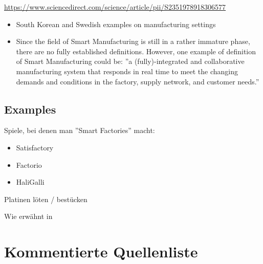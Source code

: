 \documentclass[11pt,titlepage]{article}
\begin{document}
  \url{https://www.sciencedirect.com/science/article/pii/S2351978918306577}
  \begin{itemize}
    \item South Korean and Swedish examples on manufacturing settings
    \item Since the field of Smart Manufacturing is still in a rather immature phase, there are no fully established
    definitions. However, one example of definition of Smart Manufacturing could be: ''a (fully)-integrated and
    collaborative manufacturing system that responds in real time to meet the changing demands and conditions in the
    factory, supply network, and customer needs.''
  \end{itemize}


  \subsection{Examples}
  \label{sec:Brainstorm_Examples}

  Spiele, bei denen man ''Smart Factories'' macht:
  \begin{itemize}
    \item Satisfactory 
    \item Factorio
    \item HaliGalli
  \end{itemize}


Platinen löten / bestücken

Wie erwähnt in \cite{RICHARDS.2020}

\pagebreak

\section{Kommentierte Quellenliste}
\label{sec:KommentierteQuellenliste}
  
\begingroup
\renewcommand{\section}[2]{}%


\endgroup  
  
\end{document}
